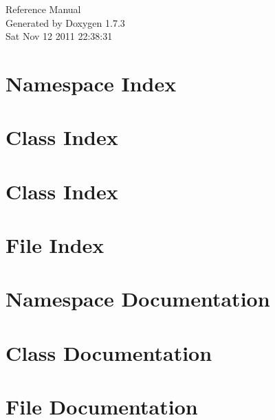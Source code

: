 \documentclass[a4paper]{book}
\begin{document}
\hypersetup{pageanchor=false}
\begin{titlepage}
\vspace*{7cm}
\begin{center}
{\Large Reference Manual}\\
\vspace*{1cm}
{\large Generated by Doxygen 1.7.3}\\
\vspace*{0.5cm}
{\small Sat Nov 12 2011 22:38:31}\\
\end{center}
\end{titlepage}
\clearemptydoublepage
{}
\tableofcontents
\clearemptydoublepage
{}
\hypersetup{pageanchor=true}
\chapter{Namespace Index}

\chapter{Class Index}

\chapter{Class Index}

\chapter{File Index}

\chapter{Namespace Documentation}

\chapter{Class Documentation}















\chapter{File Documentation}

















\printindex
\end{document}
